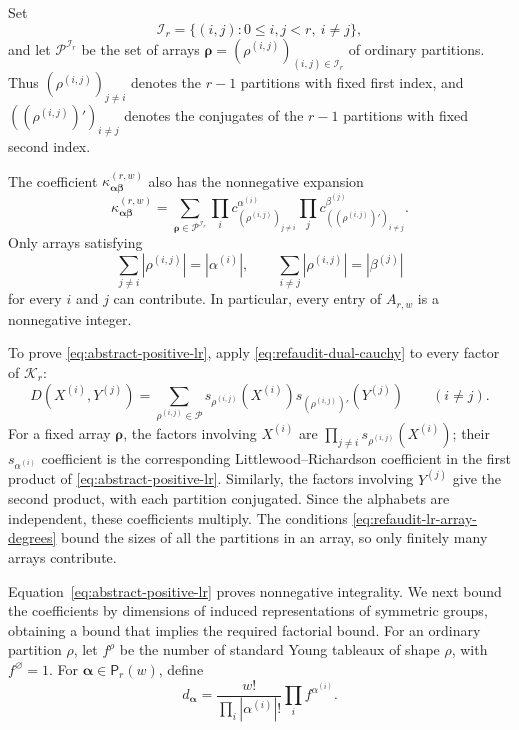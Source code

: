 \documentclass[12pt,reqno,a4paper]{amsart}
\numberwithin{equation}{section}
\numberwithin{figure}{section}
\theoremstyle{plain}
\theoremstyle{definition}
\begin{document}
Set
\[
 \mathcal I_r=\{(i,j):0\leq i,j<r,\ i\neq j\},
\]
and let $\mathscr P^{\mathcal I_r}$ be the set of arrays
$\boldsymbol\rho=(\rho^{(i,j)})_{(i,j)\in\mathcal I_r}$ of ordinary
partitions.  Thus $(\rho^{(i,j)})_{j\neq i}$ denotes the $r-1$
partitions with fixed first index, and
$((\rho^{(i,j)})')_{i\neq j}$ denotes the conjugates of the $r-1$
partitions with fixed second index.

The coefficient $\kappa^{(r,w)}_{\boldsymbol\alpha\boldsymbol\beta}$
also has the nonnegative expansion
\begin{equation}\label{eq:abstract-positive-lr}
 \kappa^{(r,w)}_{\boldsymbol\alpha\boldsymbol\beta}
 =\sum_{\boldsymbol\rho\in\mathscr P^{\mathcal I_r}}
  \prod_i c^{\alpha^{(i)}}_{(\rho^{(i,j)})_{j\neq i}}
  \prod_j c^{\beta^{(j)}}_{((\rho^{(i,j)})')_{i\neq j}}.
\end{equation}
Only arrays satisfying
\begin{equation}\label{eq:refaudit-lr-array-degrees}
 \sum_{j\neq i}|\rho^{(i,j)}|=|\alpha^{(i)}|,
 \qquad
 \sum_{i\neq j}|\rho^{(i,j)}|=|\beta^{(j)}|
\end{equation}
for every $i$ and $j$ can contribute.  In particular, every entry of
$A_{r,w}$ is a nonnegative integer.

To prove \eqref{eq:abstract-positive-lr}, apply
\eqref{eq:refaudit-dual-cauchy} to every factor of $\mathcal K_r$:
\[
 D(X^{(i)},Y^{(j)})
 =\sum_{\rho^{(i,j)}\in\mathscr P}
   s_{\rho^{(i,j)}}(X^{(i)})
   s_{(\rho^{(i,j)})'}(Y^{(j)})
 \qquad(i\ne j).
\]
For a fixed array $\boldsymbol\rho$, the factors involving
$X^{(i)}$ are $\prod_{j\ne i}s_{\rho^{(i,j)}}(X^{(i)})$;
their $s_{\alpha^{(i)}}$ coefficient is the corresponding
Littlewood--Richardson coefficient in the first product of
\eqref{eq:abstract-positive-lr}.  Similarly, the factors involving
$Y^{(j)}$ give the second product, with each partition conjugated.
Since the alphabets are independent, these coefficients multiply.
The conditions
\eqref{eq:refaudit-lr-array-degrees} bound the sizes of all the
partitions in an array, so only finitely many arrays contribute.

Equation~\eqref{eq:abstract-positive-lr} proves nonnegative
integrality.  We next bound the coefficients by dimensions of
induced representations of symmetric groups, obtaining a bound
that implies the required factorial bound.
For an ordinary partition $\rho$, let $f^\rho$ be the number of
standard Young tableaux of shape $\rho$, with $f^\varnothing=1$.
For $\boldsymbol\alpha\in\mathsf P_r(w)$, define
\begin{equation}\label{eq:universal-dimension}
 d_{\boldsymbol\alpha}
 =\frac{w!}{\prod_i|\alpha^{(i)}|!}\prod_i f^{\alpha^{(i)}}.
\end{equation}
\end{document}
